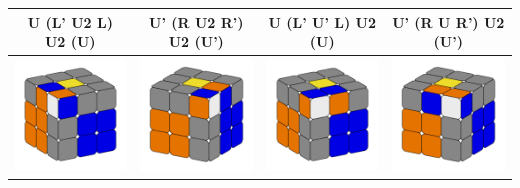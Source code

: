 \documentclass[12pt, a3paper]{article}
\newcommand{\scale}{1}
\begin{document}
\begin{center}
\begin{longtable}{c|c||c|c}
	U (L' U2 L) U2 (U) & U' (R U2 R') U2 (U') & U (L' U' L) U2 (U) & U' (R U R') U2 (U') \\
	\hline
	\hline
	\includegraphics[scale=\scale]{7l} & \includegraphics[scale=\scale]{7r}  &  \includegraphics[scale=\scale]{8l} & \includegraphics[scale=\scale]{8r} \\

\end{longtable}
\end{center}
\end{document}
